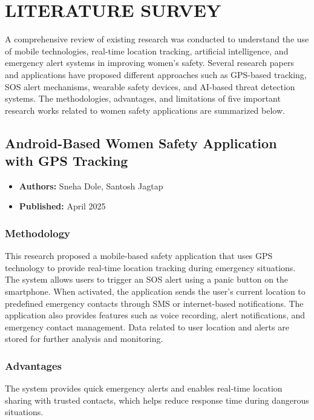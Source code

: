 \documentclass[a4paper,12pt]{report}
\begin{document}
\chapter{LITERATURE SURVEY}
\par A comprehensive review of existing research was conducted to understand the use of mobile technologies, real-time location tracking, artificial intelligence, and emergency alert systems in improving women’s safety. Several research papers and applications have proposed different approaches such as GPS-based tracking, SOS alert mechanisms, wearable safety devices, and AI-based threat detection systems. The methodologies, advantages, and limitations of five important research works related to women safety applications are summarized below.

\section{Android-Based Women Safety Application with GPS Tracking}
\begin{itemize}
    \item \textbf{Authors:} Sneha Dole, Santosh Jagtap
    \item \textbf{Published:} April 2025
\end{itemize}

\subsection{Methodology}
\par This research proposed a mobile-based safety application that uses GPS technology to provide real-time location tracking during emergency situations. The system allows users to trigger an SOS alert using a panic button on the smartphone. When activated, the application sends the user’s current location to predefined emergency contacts through SMS or internet-based notifications. The application also provides features such as voice recording, alert notifications, and emergency contact management. Data related to user location and alerts are stored for further analysis and monitoring.

\subsection{Advantages}
\par The system provides quick emergency alerts and enables real-time location sharing with trusted contacts, which helps reduce response time during dangerous situations.
\end{document}
